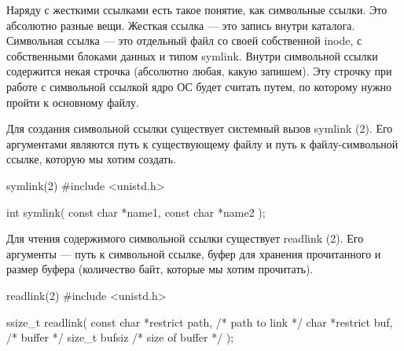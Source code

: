 Наряду с жесткими ссылками есть такое понятие, как символьные ссылки. Это абсолютно разные вещи. Жесткая ссылка --- это запись внутри каталога. Символьная ссылка --- это отдельный файл со своей собственной inode, с собственными блоками данных и типом symlink. Внутри символьной ссылки содержится некая строчка (абсолютно любая, какую запишем). Эту строчку при работе с символьной ссылкой ядро ОС будет считать путем, по которому нужно пройти к основному файлу.

Для создания символьной ссылки существует системный вызов symlink (2). Его аргументами являются путь к существующему файлу и путь к файлу-символьной ссылке, которую мы хотим создать. 

\begin{CCode}{symlink(2)}
	#include <unistd.h>

	int symlink(
		const char *name1, 
		const char *name2
	); \end{CCode}

Для чтения содержимого символьной ссылки существует readlink (2). Его аргументы --- путь к символьной ссылке, буфер для хранения прочитанного и размер буфера (количество байт, которые мы хотим прочитать). 

\begin{CCode}{readlink(2)}
	#include <unistd.h>

	ssize_t readlink( 
		const char *restrict path,	/* path to link */ 
		char *restrict buf,			/* buffer */ 
		size_t bufsiz				/* size of buffer */ 
	); \end{CCode}
